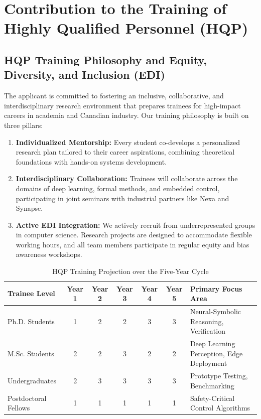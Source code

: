 \documentclass[12pt, letterpaper]{article}
\begin{document}
\section{Contribution to the Training of Highly Qualified Personnel (HQP)}
\subsection{HQP Training Philosophy and Equity, Diversity, and Inclusion (EDI)}
The applicant is committed to fostering an inclusive, collaborative, and interdisciplinary research environment that prepares trainees for high-impact careers in academia and Canadian industry. Our training philosophy is built on three pillars:

\begin{enumerate}[leftmargin=1.5em, itemsep=3pt]
  \item \textbf{Individualized Mentorship:} Every student co-develops a personalized research plan tailored to their career aspirations, combining theoretical foundations with hands-on systems development.
  \item \textbf{Interdisciplinary Collaboration:} Trainees will collaborate across the domains of deep learning, formal methods, and embedded control, participating in joint seminars with industrial partners like Nexa and Synapse.
  \item \textbf{Active EDI Integration:} We actively recruit from underrepresented groups in computer science. Research projects are designed to accommodate flexible working hours, and all team members participate in regular equity and bias awareness workshops.
\end{enumerate}

\begin{table}[htbp]
  \centering
  \caption{HQP Training Projection over the Five-Year Cycle}
  \label{tab:hqp_projection}
  \small
  \begin{tabularx}{\textwidth}{l c c c c c X}
    \toprule
    \textbf{Trainee Level} & \textbf{Year 1} & \textbf{Year 2} & \textbf{Year 3} & \textbf{Year 4} & \textbf{Year 5} & \textbf{Primary Focus Area} \\
    \midrule
    Ph.D. Students & 1 & 2 & 2 & 3 & 3 & Neural-Symbolic Reasoning, Verification \\
    M.Sc. Students & 2 & 2 & 3 & 2 & 2 & Deep Learning Perception, Edge Deployment \\
    Undergraduates & 2 & 3 & 3 & 3 & 3 & Prototype Testing, Benchmarking \\
    Postdoctoral Fellows & 1 & 1 & 1 & 1 & 1 & Safety-Critical Control Algorithms \\
    \bottomrule
  \end{tabularx}
\end{table}
\end{document}
